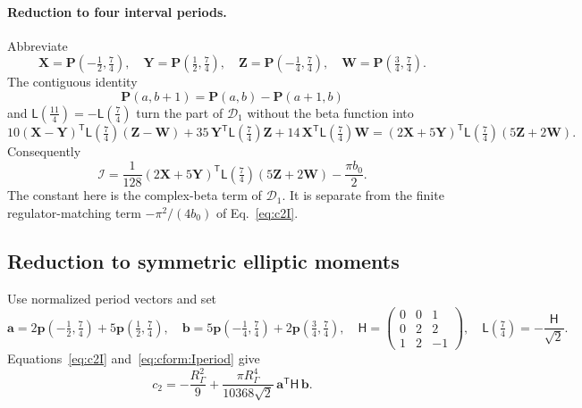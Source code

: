 \documentclass[11pt,a4paper]{article}
\numberwithin{equation}{section}
\newcommand{\cI}{\mathcal I}
\begin{document}
\paragraph{Reduction to four interval periods.} Abbreviate
\begin{equation}
 \mathbf X=\mathbf P(-\tfrac12,\tfrac74),\quad\mathbf Y=\mathbf P(\tfrac12,\tfrac74),\quad
 \mathbf Z=\mathbf P(-\tfrac14,\tfrac74),\quad\mathbf W=\mathbf P(\tfrac34,\tfrac74).
\end{equation}
The contiguous identity
\begin{equation}
 \mathbf P(a,b+1)=\mathbf P(a,b)-\mathbf P(a+1,b)
 \label{eq:cform:contiguous}
\end{equation}
and $\mathsf L(\frac{11}4)=-\mathsf L(\frac74)$ turn the part of $\mathcal D_1$ without the beta function into
\begin{equation}
 10(\mathbf X-\mathbf Y)^{\mathsf T}\mathsf L(\tfrac74)(\mathbf Z-\mathbf W)+35\,\mathbf Y^{\mathsf T}\mathsf L(\tfrac74)\mathbf Z
 +14\,\mathbf X^{\mathsf T}\mathsf L(\tfrac74)\mathbf W
 =(2\mathbf X+5\mathbf Y)^{\mathsf T}\mathsf L(\tfrac74)(5\mathbf Z+2\mathbf W).
\end{equation}
Consequently
\begin{equation}
 \cI=\frac1{128}(2\mathbf X+5\mathbf Y)^{\mathsf T}\mathsf L(\tfrac74)(5\mathbf Z+2\mathbf W)-\frac{\pi b_0}{2}.
 \label{eq:cform:Iperiod}
\end{equation}
The constant here is the complex-beta term of $\mathcal D_1$. It is separate from the finite regulator-matching term
$-\pi^2/(4b_0)$ of Eq.~\eqref{eq:c2I}.

\subsection{Reduction to symmetric elliptic moments}\label{app:cform:symmetric}
Use normalized period vectors and set
\begin{equation}
 \mathbf a=2\mathbf p(-\tfrac12,\tfrac74)+5\mathbf p(\tfrac12,\tfrac74),\quad
 \mathbf b=5\mathbf p(-\tfrac14,\tfrac74)+2\mathbf p(\tfrac34,\tfrac74),\quad
 \mathsf H=\begin{pmatrix}0&0&1\\0&2&2\\1&2&-1\end{pmatrix},\quad
 \mathsf L(\tfrac74)=-\frac{\mathsf H}{\sqrt2}.
\end{equation}
Equations~\eqref{eq:c2I} and~\eqref{eq:cform:Iperiod} give
\begin{equation}
 c_2=-\frac{R_\Gamma^2}{9}+\frac{\pi R_\Gamma^4}{10368\sqrt2}\,\mathbf a^{\mathsf T}\mathsf H\,\mathbf b.
 \label{eq:cform:c2matrix}
\end{equation}
\end{document}
